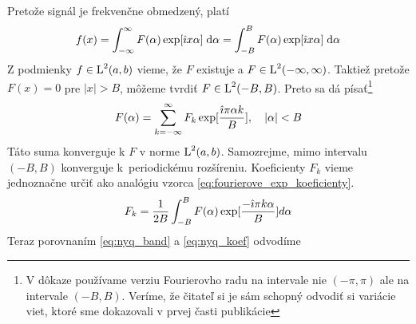 \begin{dokaz}
    Pretože signál je frekvenčne obmedzený, platí
    \begin{equation}
        f(x) = \int_{-\infty}^{\infty} F(\alpha) \exp[ \hat{\imath} x \alpha]
        \; \mathrm{d}\alpha = \int_{-B}^{B} F(\alpha) \exp[ \hat{\imath} x \alpha]
        \; \mathrm{d}\alpha
        \label{eq:nyq_band}
    \end{equation}
    Z podmienky $f\in\mbox{L}^2(a,b)$ vieme,
    že $F$ existuje a  $F \in \mbox{L}^2(-\infty,\infty)$. Taktiež
    pretože $F(x) = 0$ pre $|x| > B$, môžeme tvrdiť $F \in \mbox{L}^2(-B,B)$.
    Preto sa dá písať\footnote{V dôkaze používame verziu Fourierovho
    radu na intervale nie $(-\pi,\pi)$ ale na intervale $(-B,B)$.
    Veríme, že čitateľ si je sám schopný odvodiť si variácie viet,
    ktoré sme dokazovali v prvej časti publikácie}
    \begin{equation}
        F(\alpha) = \sum_{k=-\infty}^{\infty} F_k \exp[\frac{\hat{\imath} \pi
        \alpha k}{B}],\quad|\alpha|<B
        \label{eq:nyq_series}
    \end{equation}
    Táto suma konverguje k $F$ v norme $\mbox{L}^2(a,b)$. 
    Samozrejme, mimo intervalu $(-B,B)$ konverguje k~periodickému
    rozšíreniu.
    Koeficienty $F_k$ vieme jednoznačne určiť ako analógiu vzorca
    \ref{eq:fourierove_exp_koeficienty}.
    \begin{equation}
        F_k = \frac{1}{2B} \int_{-B}^{B} F(\alpha) \exp[\frac{- \hat{\imath}
        \pi k \alpha}{B}] d\alpha
        \label{eq:nyq_koef}
    \end{equation}
    Teraz porovnaním \eqref{eq:nyq_band} a \eqref{eq:nyq_koef} odvodíme        
    

\end{dokaz}
